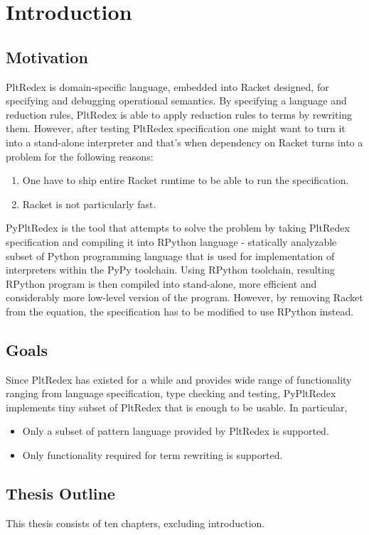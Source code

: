 \chapter{Introduction}
\section{Motivation}
PltRedex is domain-specific language, embedded into Racket designed, for specifying and debugging operational semantics. By specifying a language and reduction rules, PltRedex is able to apply reduction rules to terms by rewriting them. 
However, after testing PltRedex specification one might want to turn it into a stand-alone interpreter and that's when dependency on Racket turns into a problem for the following reasons:

\begin{enumerate}
\item 
One have to ship entire Racket runtime to be able to run the specification.
\item
Racket is not particularly fast. 
\end{enumerate}

PyPltRedex is the tool that attempts to solve the problem by taking PltRedex specification and compiling it into RPython language - statically analyzable subset of Python programming language that is used for implementation of interpreters within the PyPy toolchain. Using RPython toolchain, resulting RPython program is then compiled into stand-alone, more efficient and considerably more low-level version of the program. However, by removing Racket from the equation, the specification has to be modified to use RPython instead.

\section{Goals}
Since PltRedex has existed for a while and provides wide range of functionality ranging from language specification, type checking and testing, PyPltRedex implements tiny subset of PltRedex that is enough to be usable. In particular,

\begin{itemize}
\item Only a subset of pattern language provided by PltRedex is supported.
\item
Only functionality required for term rewriting is supported.
\end{itemize}

\section{Thesis Outline}
This thesis consists of ten chapters, excluding introduction.

